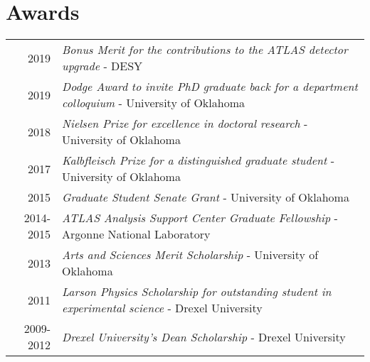 \documentclass[a4paper,10pt]{article}
\begin{document}
\vspace{3mm}
\section{Awards}

\begin{tabular}{rp{15.5cm}}
\textsc{2019}       & {\em Bonus Merit for the contributions to the ATLAS detector upgrade} - DESY\\
\textsc{2019}       & {\em Dodge Award to invite PhD graduate back for a department colloquium} - University of Oklahoma\\
\textsc{2018}       & {\em Nielsen Prize for excellence in doctoral research} - University of Oklahoma\\
\textsc{2017}       & {\em Kalbfleisch Prize for a distinguished graduate student} - University of Oklahoma\\
\textsc{2015}       & {\em Graduate Student Senate Grant} - University of Oklahoma\\
\textsc{2014-2015}    & {\em ATLAS Analysis Support Center Graduate Fellowship} - Argonne National Laboratory\\
\textsc{2013}       & {\em Arts and Sciences Merit Scholarship} - University of Oklahoma\\
\textsc{2011}       & {\em Larson Physics Scholarship for outstanding student in experimental science} - Drexel University\\
\textsc{2009-2012}    & {\em Drexel University's Dean Scholarship} - Drexel University\\
\end{tabular}



\vspace{3mm}
\end{document}

